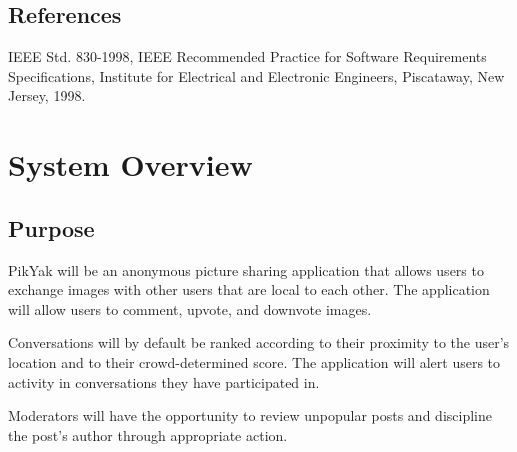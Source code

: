 \documentclass[11pt]{scrartcl}
\let\stdsection\section
\renewcommand\section{\newpage\stdsection}
\begin{document}
    \subsection{References}
        IEEE Std. 830-1998, IEEE Recommended Practice for Software Requirements Specifications, Institute for Electrical and Electronic Engineers, Piscataway, New Jersey, 1998.

\section{System Overview}
    \subsection{Purpose}
        PikYak will be an anonymous picture sharing application that allows users to exchange images with other users that are local to each other.  The application will allow users to comment, upvote, and downvote images.

        Conversations will by default be ranked according to their proximity to the user's location and to their crowd-determined score.  The application will alert users to activity in conversations they have participated in.

        Moderators will have the opportunity to review unpopular posts and discipline the post's author through appropriate action.
\end{document}
